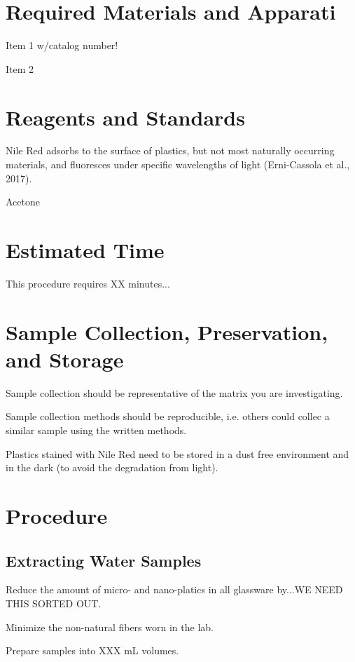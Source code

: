 \documentclass[12pt]{../SOP4_alpha}\usepackage[]{graphicx}\usepackage[]{color}
\begin{document}
\section{Required Materials and Apparati}

\NP Item 1 w/catalog number!

\NP Item 2

\section{Reagents and Standards}

\NP Nile Red adsorbs to the surface of plastics, but not most naturally occurring materials, and fluoresces under specific wavelengths of light (Erni-Cassola et al., 2017). 

\NP Acetone

\section{Estimated Time}

\NP This procedure requires XX minutes...

\section{Sample Collection, Preservation, and Storage}

\NP Sample collection should be representative of the matrix you are investigating. 

\NP Sample collection methods should be reproducible, i.e. others could collec a similar sample using the written methods. 

\NP Plastics stained with Nile Red need to be stored in a dust free environment and in the dark (to avoid the degradation from light).

\section{Procedure}

\subsection{Extracting Water Samples}

\NP Reduce the amount of micro- and nano-platics in all glassware by...WE NEED THIS SORTED OUT. 

\NP Minimize the non-natural fibers worn in the lab. 

\NP Prepare samples into XXX mL volumes. 
\end{document}
